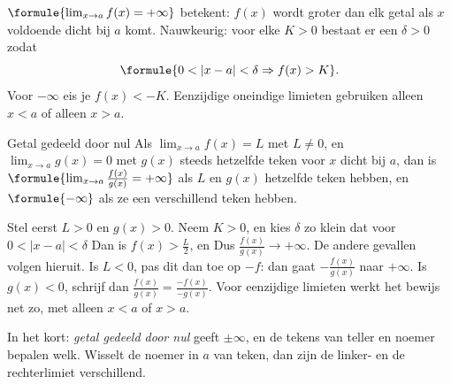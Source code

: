 \begin{theorie}
$\formule{\lim_{x \to a} f(x) = +\infty}$ betekent: $f(x)$ wordt groter dan elk getal als $x$ voldoende dicht bij $a$ komt. Nauwkeurig: voor elke $K > 0$ bestaat er een $\delta > 0$ zodat
\[\formule{0 < |x - a| < \delta \Rightarrow f(x) > K}.\]
Voor $-\infty$ eis je $f(x) < -K$. Eenzijdige oneindige limieten gebruiken alleen $x < a$ of alleen $x > a$.

\begin{stelling}{Getal gedeeld door nul}
Als $\lim_{x \to a} f(x) = L$ met $L \neq 0$, en $\lim_{x \to a} g(x) = 0$ met $g(x)$ steeds hetzelfde teken voor $x$ dicht bij $a$, dan is $\formule{\lim_{x \to a} \frac{f(x)}{g(x)} = +\infty}$ als $L$ en $g(x)$ hetzelfde teken hebben, en $\formule{-\infty}$ als ze een verschillend teken hebben.
\end{stelling}
\begin{bewijs}
Stel eerst $L > 0$ en $g(x) > 0$. Neem $K > 0$, en kies $\delta$ zo klein dat voor $0 < |x - a| < \delta$
Dan is $f(x) > \frac{L}{2}$, en
Dus $\frac{f(x)}{g(x)} \to +\infty$. De andere gevallen volgen hieruit. Is $L < 0$, pas dit dan toe op $-f$: dan gaat $-\frac{f(x)}{g(x)}$ naar $+\infty$. Is $g(x) < 0$, schrijf dan $\frac{f(x)}{g(x)} = \frac{-f(x)}{-g(x)}$. Voor eenzijdige limieten werkt het bewijs net zo, met alleen $x < a$ of $x > a$.
\end{bewijs}
\end{theorie}

In het kort: \textit{getal gedeeld door nul} geeft $\pm\infty$, en de tekens van teller en noemer bepalen welk. Wisselt de noemer in $a$ van teken, dan zijn de linker- en de rechterlimiet verschillend.


